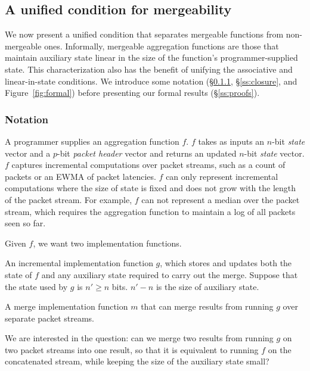 \subsection{A unified condition for mergeability}
\label{sec:unifies}
We now present a unified condition that separates mergeable functions from
non-mergeable ones.  Informally, mergeable aggregation functions are those that
maintain auxiliary state linear in the size of the function's
programmer-supplied state. This characterization also has the benefit of
unifying the associative and linear-in-state conditions.  We introduce some
notation (\S\ref{ss:notation}, \S\ref{ss:closure}, and
Figure~\ref{fig:formal}) before presenting our formal results
(\S\ref{ss:proofs}).

\subsubsection{Notation}
\label{ss:notation}

A programmer supplies an aggregation function $f$. $f$ takes as inputs an
$n$-bit \emph{state} vector and a $p$-bit \emph{packet header} vector and
returns an updated $n$-bit \emph{state} vector. $f$ captures incremental
computations over packet streams, such as a count of packets or an EWMA of
packet latencies. $f$ can only represent incremental computations where the
size of state is fixed and does not grow with the length of the packet stream.
For example, $f$ can not represent a median over the packet stream, which
requires the aggregation function to maintain a log of all packets seen so far.

Given $f$, we want two implementation functions.
\begin{CompactEnumerate}
\item An incremental implementation function $g$, which stores and updates both
the state of $f$ and any auxiliary state required to carry out the merge.
Suppose that the state used by $g$ is $n' \geq n$ bits. $n'-n$ is the
size of auxiliary state.
\item A merge implementation function $m$ that can merge results from running
$g$ over separate packet streams.
\end{CompactEnumerate}

We are interested in the question: can we merge two results from running $g$ on
two packet streams into one result, so that it is equivalent to running $f$ on
the concatenated stream, while keeping the size of the auxiliary state small?

